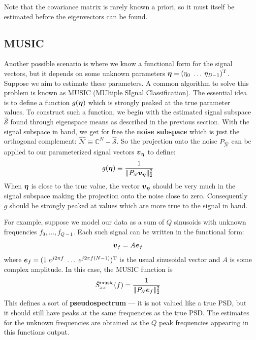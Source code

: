 \documentclass[twocolumn]{gwclass}
\newcommand{\C}{\mathbb{C}}
\begin{document}
Note that the covariance matrix is rarely known a priori, so it must itself be estimated before the eigenvectors can be found. 

\subsection{MUSIC}
Another possible scenario is where we know a functional form for the signal vectors, but it depends on some unknown parameters $\boldsymbol{\eta}=(\eta_0\;\dots\;\eta_{D-1})^{\text{\normalfont{T}}}$. Suppose we aim to estimate these parameters. A common algorithm to solve this problem is known as MUSIC (MUltiple SIgnal Classification). The essential idea is to define a function $g(\boldsymbol{\eta})$ which is strongly peaked at the true parameter values. To construct such a function, we begin with the estimated signal subspace $\hat{\mathcal{S}}$ found through eigenspace means as described in the previous section. With the signal subspace in hand, we get for free the \textbf{noise subspace} which is just the orthogonal complement: $\hat{\mathcal{N}}\equiv\C^N - \hat{\mathcal{S}}$. So the projection onto the noise $P_{\scriptscriptstyle\hat{\mathcal{N}}}$ can be applied to our parameterized signal vectors $\boldsymbol{v}_{\boldsymbol{\eta}}$ to define:
$$ g(\boldsymbol{\eta}) \equiv \frac{1}{\|P_{\scriptscriptstyle\hat{\mathcal{N}}}\boldsymbol{v}_{\boldsymbol{\eta}}\|_2^2} $$
When $\boldsymbol{\eta}$ is close to the true value, the vector $\boldsymbol{v}_{\boldsymbol{\eta}}$ should be very much in the signal subspace making the projection onto the noise close to zero. Consequently $g$ should be strongly peaked at values which are more true to the signal in hand.

For example, suppose we model our data as a sum of $Q$ sinusoids with unknown frequencies $f_0,\dots,f_{Q-1}$. Each such signal can be written in the functional form:
$$ \boldsymbol{v}_f = A\boldsymbol{e}_{f} $$
where $\boldsymbol{e}_f=(1\;e^{j2\pi f}\;\dots\;e^{j2\pi f (N-1)})^{\text{\normalfont{T}}}$ is the usual sinusoidal vector and $A$ is some complex amplitude. In this case, the MUSIC function is 
$$ \hat{S}_{xx}^{\text{\normalfont{music}}}(f) = \frac{1}{\|P_{\scriptscriptstyle\hat{\mathcal{N}}} \boldsymbol{e}_f\|_2^2} $$
This defines a sort of \textbf{pseudospectrum} --- it is not valued like a true PSD, but it should still have peaks at the same frequencies as the true PSD. The estimates for the unknown frequencies are obtained as the $Q$ peak frequencies appearing in this functions output.
\end{document}
